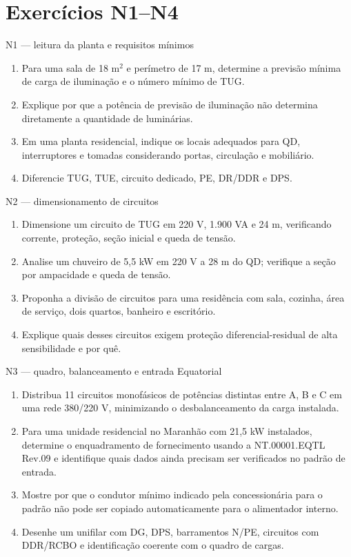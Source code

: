 \section{Exercícios N1--N4}

\begin{frame}{N1 — leitura da planta e requisitos mínimos}
\small
\begin{enumerate}
\item Para uma sala de 18 m$^2$ e perímetro de 17 m, determine a previsão mínima de carga de iluminação e o número mínimo de TUG.
\item Explique por que a potência de previsão de iluminação não determina diretamente a quantidade de luminárias.
\item Em uma planta residencial, indique os locais adequados para QD, interruptores e tomadas considerando portas, circulação e mobiliário.
\item Diferencie TUG, TUE, circuito dedicado, PE, DR/DDR e DPS.
\end{enumerate}
\end{frame}

\begin{frame}{N2 — dimensionamento de circuitos}
\small
\begin{enumerate}
\item Dimensione um circuito de TUG em 220 V, 1.900 VA e 24 m, verificando corrente, proteção, seção inicial e queda de tensão.
\item Analise um chuveiro de 5,5 kW em 220 V a 28 m do QD; verifique a seção por ampacidade e queda de tensão.
\item Proponha a divisão de circuitos para uma residência com sala, cozinha, área de serviço, dois quartos, banheiro e escritório.
\item Explique quais desses circuitos exigem proteção diferencial-residual de alta sensibilidade e por quê.
\end{enumerate}
\end{frame}

\begin{frame}{N3 — quadro, balanceamento e entrada Equatorial}
\small
\begin{enumerate}
\item Distribua 11 circuitos monofásicos de potências distintas entre A, B e C em uma rede 380/220 V, minimizando o desbalanceamento da carga instalada.
\item Para uma unidade residencial no Maranhão com 21,5 kW instalados, determine o enquadramento de fornecimento usando a NT.00001.EQTL Rev.09 e identifique quais dados ainda precisam ser verificados no padrão de entrada.
\item Mostre por que o condutor mínimo indicado pela concessionária para o padrão não pode ser copiado automaticamente para o alimentador interno.
\item Desenhe um unifilar com DG, DPS, barramentos N/PE, circuitos com DDR/RCBO e identificação coerente com o quadro de cargas.
\end{enumerate}
\end{frame}


